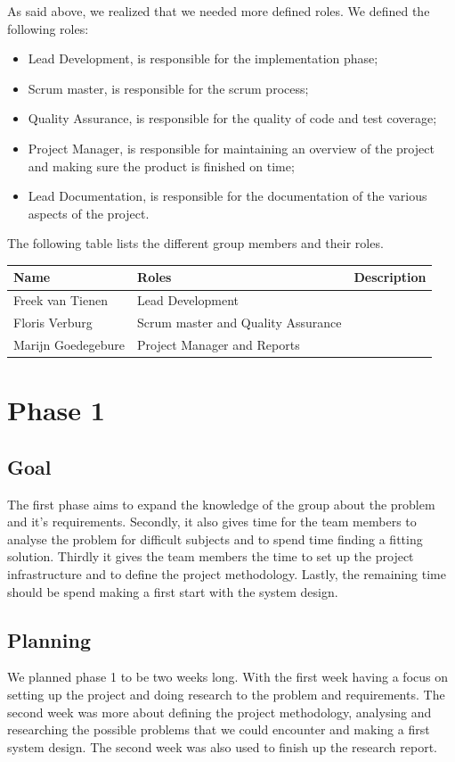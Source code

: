 As said above, we realized that we needed more defined roles.
We defined the following roles:
\begin{itemize}
\item Lead Development, is responsible for the implementation phase;
\item Scrum master, is responsible for the scrum process;
\item Quality Assurance, is responsible for the quality of code and test coverage;
\item Project Manager, is responsible for maintaining an overview of the project and making sure the product is finished on time;
\item Lead Documentation, is responsible for the documentation of the various aspects of the project.
\end{itemize}

The following table lists the different group members and their roles.\\
\begin{tabular}{|l|l|p{5cm}|}
\hline
Name & Roles & Description\\
\hline
Freek van Tienen & Lead Development\\
\hline
Floris Verburg & Scrum master and Quality Assurance\\
\hline
Marijn Goedegebure & Project Manager and Reports\\
\hline
\end{tabular}

\section{Phase 1}
\subsection{Goal}
The first phase aims to expand the knowledge of the group about the problem and it's requirements.
Secondly, it also gives time for the team members to analyse the problem for difficult subjects and to spend time finding a fitting solution.
Thirdly it gives the team members the time to set up the project infrastructure and to define the project methodology.
Lastly, the remaining time should be spend making a first start with the system design.

\subsection{Planning}
We planned phase 1 to be two weeks long.
With the first week having a focus on setting up the project and doing research to the problem and requirements.
The second week was more about defining the project methodology, analysing and researching the possible problems that we could encounter and making a first system design.
The second week was also used to finish up the research report.

